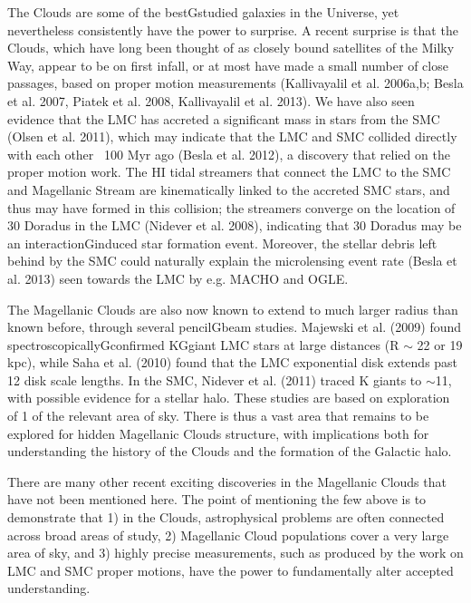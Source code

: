 The Clouds are some of the bestGstudied galaxies in the Universe, yet nevertheless  consistently have the power to surprise.  A recent surprise is that the Clouds, which  have long been thought of as closely bound satellites of the Milky Way, appear to be  on first infall, or at most have made a small number of close passages, based on  proper motion measurements (Kallivayalil et al. 2006a,b; Besla et al. 2007, Piatek et  al. 2008, Kallivayalil et al. 2013).  We have also seen evidence that the LMC has  accreted a significant mass in stars from the SMC (Olsen et al. 2011), which may  indicate that the LMC and SMC collided directly with each other ~100 Myr ago  (Besla et al. 2012), a discovery that relied on the proper motion work.  The HI tidal  streamers that connect the LMC to the SMC and Magellanic Stream are kinematically  linked to the accreted SMC stars, and thus may have formed in this collision; the  streamers converge on the location of 30 Doradus in the LMC (Nidever et al. 2008),  indicating that 30 Doradus may be an interactionGinduced star formation event.   Moreover, the stellar debris left behind by the SMC could naturally explain the  microlensing event rate (Besla et al. 2013) seen towards the LMC by e.g. MACHO and  OGLE.  

The Magellanic Clouds are also now known to extend to much larger radius than  known before, through several pencilGbeam studies.  Majewski et al. (2009) found  spectroscopicallyGconfirmed KGgiant LMC stars at large distances (R $\sim$ 22 or 19 kpc),  while Saha et al. (2010) found that the LMC exponential disk extends past 12 disk  scale lengths.  In the SMC, Nidever et al. (2011) traced K giants to $\sim$11, with  possible evidence for a stellar halo.  These studies are based on exploration of 1  of the relevant area of sky.  There is thus a vast area that remains to be explored for  hidden Magellanic Clouds structure, with implications both for understanding the  history of the Clouds and the formation of the Galactic halo.   

There are many other recent exciting discoveries in the Magellanic Clouds that have  not been mentioned here.  The point of mentioning the few above is to demonstrate  that 1) in the Clouds, astrophysical problems are often connected across broad areas  of study, 2) Magellanic Cloud populations cover a very large area of sky, and 3)  highly precise measurements, such as produced by the work on LMC and SMC  proper motions, have the power to fundamentally alter accepted understanding.  

